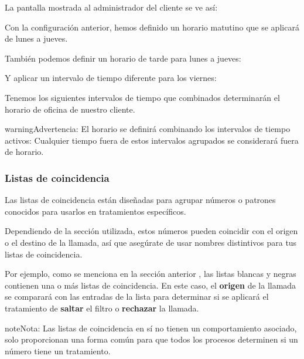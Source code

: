 \documentclass[letterpaper,10pt,spanish]{sphinxmanual}
\begin{document}
La pantalla mostrada al administrador del cliente se ve así:

Con la configuración anterior, hemos definido un horario matutino que se aplicará de lunes a jueves.

También podemos definir un horario de tarde para lunes a jueves:

Y aplicar un intervalo de tiempo diferente para los viernes:

Tenemos los siguientes intervalos de tiempo que combinados determinarán el horario de oficina de nuestro cliente.

\begin{notice}{warning}{Advertencia:}
El horario se definirá combinando los intervalos de tiempo activos: Cualquier tiempo fuera de estos intervalos agrupados se considerará fuera de horario.
\end{notice}
\label{administration_portal/client/vpbx/routing_tools/match_lists:match-lists}

\subsubsection{Listas de coincidencia}
\label{administration_portal/client/vpbx/routing_tools/match_lists:match-lists}\label{administration_portal/client/vpbx/routing_tools/match_lists:id2}\label{administration_portal/client/vpbx/routing_tools/match_lists::doc}\label{administration_portal/client/vpbx/routing_tools/match_lists:id1}
Las listas de coincidencia están diseñadas para agrupar números o patrones conocidos para usarlos en tratamientos específicos.

Dependiendo de la sección utilizada, estos números pueden coincidir con el origen o el destino de la llamada, así que asegúrate de usar nombres distintivos para tus listas de coincidencia.

Por ejemplo, como se menciona en la sección anterior {\hyperref[administration_portal/client/vpbx/routing_tools/external_call_filters:external\string-filters]{}}, las listas blancas y negras contienen una o más listas de coincidencia. En este caso, el \textbf{origen} de la llamada se comparará con las entradas de la lista para determinar si se aplicará el tratamiento de \textbf{saltar} el filtro o \textbf{rechazar} la llamada.

\begin{notice}{note}{Nota:}
Las listas de coincidencia en sí no tienen un comportamiento asociado, solo proporcionan una forma común para que todos los procesos determinen si un número tiene un tratamiento.
\end{notice}
\end{document}
